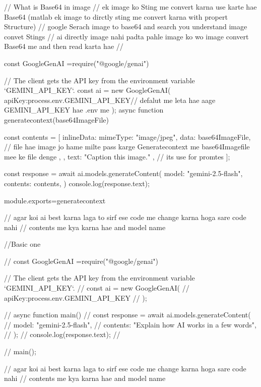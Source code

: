 // What is Base64 in image 
// ek image ko Sting me convert karna use karte hae Base64 (matlab ek image to dirctly sting me convert karna with  propert Structure)
// google Serach image to base64 and search you understand image convet Stings
// ai directly image nahi padta pahle image ko wo image convert Base64 me and then read karta hae 
//


const { GoogleGenAI } =require("@google/genai")

// The client gets the API key from the environment variable `GEMINI_API_KEY`.
const ai = new GoogleGenAI({  
    apiKey:process.env.GEMINI_API_KEY// defalut me leta hae aage GEMINI_API_KEY  hae .env me 
});
async function generatecontext(base64ImageFile) {
  const contents = [
    {
      inlineData: {
        mimeType: "image/jpeg",
      data: base64ImageFile, // file hae image jo hame milte pass karge Generatecontext me  base64Imagefile mee ke file denge
    },
  },
  { text: "Caption this image." }, // its use for promtes
];

const response = await ai.models.generateContent({
  model: "gemini-2.5-flash",
  contents: contents,
}) 
console.log(response.text);}

 module.exports={generatecontext}





















// agar koi ai best karna laga to sirf ese code me change karna hoga sare code nahi
// contents me kya karna hae and model name 




//Basic one 

// const { GoogleGenAI } =require("@google/genai")

// The client gets the API key from the environment variable `GEMINI_API_KEY`.
// const ai = new GoogleGenAI({
//     apiKey:process.env.GEMINI_API_KEY
// });

// async function main() {
//   const response = await ai.models.generateContent({
//     model: "gemini-2.5-flash",
//     contents: "Explain how AI works in a few words", 
//   });
//   console.log(response.text);
// }

// main();

// agar koi ai best karna laga to sirf ese code me change karna hoga sare code nahi
// contents me kya karna hae and model name 